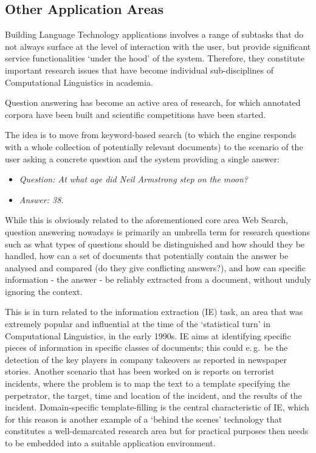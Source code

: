 \begin{multicols}{2}
\subsection{Other Application Areas}

Building Language Technology applications involves a range of subtasks that do not always surface at the level of interaction with the user, but provide significant service functionalities ‘under the hood’ of the system. Therefore, they constitute important research issues that have become individual sub-disciplines of Computational Linguistics in academia. 

Question answering has become an active area of research, for which annotated corpora have been built and scientific competitions have been started.

The idea is to move from keyword-based search (to which the engine responds with a whole collection of potentially relevant documents) to the scenario of the user asking a concrete question and the system providing a single answer: \\
\begin{itemize}
\item[] \textit{Question: At what age did Neil Armstrong step on the moon?}
\item[] \textit{Answer: 38.}
\end{itemize}

While this is obviously related to the aforementioned core area Web Search, question answering nowadays is primarily an umbrella term for research questions such as what types of questions should be distinguished and how should they be handled, how can a set of documents that potentially contain the answer be analysed and compared (do they give conflicting answers?), and how can specific information - the answer - be reliably extracted from a document, without unduly ignoring the context. 


This is in turn related to the information extraction (IE) task, an area that was extremely popular and influential at the time of the ‘statistical turn’ in Computational Linguistics, in the early 1990s. IE aims at identifying specific pieces of information in specific classes of documents; this could e.\,g.~be the detection of the key players in company takeovers as reported in newspaper stories. Another scenario that has been worked on is reports on terrorist incidents, where the problem is to map the text to a template specifying the perpetrator, the target, time and location of the incident, and the results of the incident. Domain-specific template-filling is the central characteristic of IE, which for this reason is another example of a ‘behind the scenes’ technology that constitutes a well-demarcated research area but for practical purposes then needs to be embedded into a suitable application environment. 


\end{multicols}

